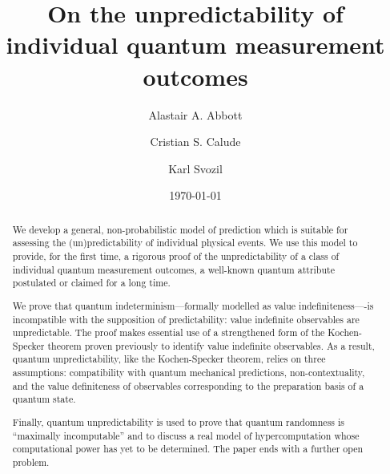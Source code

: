\documentclass[%
 superscriptaddress,
 preprint,
 showpacs,
 showkeys,
 preprintnumbers,
  amsmath,amssymb,
  aps,
 pra,
  longbibliography,
  floatfix,
 ]{revtex4-1}
\theoremstyle{definition}
\begin{document}
	
\title{On the unpredictability of individual quantum measurement outcomes}
	
\author{Alastair A. Abbott}


\author{Cristian S. Calude}




\author{Karl Svozil}



\date{\today}

\begin{abstract}
We develop a general, non-probabilistic model of prediction which is suitable for assessing the (un)predictability of individual physical events.
We use this model to provide, for the first time, a rigorous proof of the unpredictability of a class of individual quantum measurement outcomes, a well-known quantum attribute postulated or claimed for a long time.

We prove that quantum indeterminism---formally modelled as value indefiniteness----is incompatible with the supposition 
of predictability: value indefinite observables are unpredictable.
The proof makes essential use of a strengthened form of the Kochen-Specker theorem proven previously to identify value indefinite observables.
As a result,  quantum unpredictability, like the Kochen-Specker theorem, relies on three assumptions: 
compatibility with quantum mechanical predictions, non-contextuality, and the value definiteness of observables corresponding to the preparation basis of a quantum state.

Finally, quantum unpredictability is used to  prove that quantum randomness is ``maximally incomputable'' and to discuss a real model of hypercomputation whose computational power has yet to be determined. 
The paper ends with a further open problem.
\end{abstract}
\end{document}
